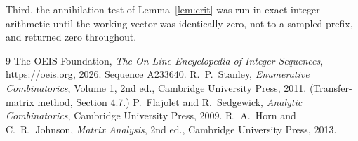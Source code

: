\documentclass[11pt,a4paper]{article}
\theoremstyle{plain}
\theoremstyle{definition}
\begin{document}
Third, the annihilation test of Lemma~\ref{lem:crit} was run in exact integer arithmetic
until the working vector was identically zero, not to a sampled prefix, and returned zero
throughout.

\begin{thebibliography}{9}
 The OEIS Foundation, \emph{The On-Line Encyclopedia of Integer
Sequences}, \url{https://oeis.org}, 2026. Sequence A233640.
 R.~P.~Stanley, \emph{Enumerative Combinatorics}, Volume 1, 2nd ed.,
Cambridge University Press, 2011. (Transfer-matrix method, Section 4.7.)
 P.~Flajolet and R.~Sedgewick, \emph{Analytic Combinatorics}, Cambridge
University Press, 2009.
 R.~A.~Horn and C.~R.~Johnson, \emph{Matrix Analysis}, 2nd ed., Cambridge
University Press, 2013.
\end{thebibliography}
\end{document}
